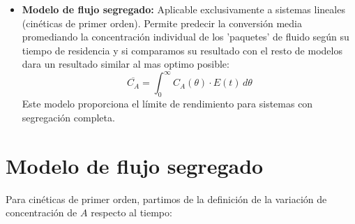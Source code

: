 \begin{itemize}
    \item \textbf{Modelo de flujo segregado:} \label{sec:flujo_segregado}
          Aplicable exclusivamente a sistemas lineales (cinéticas de primer orden). Permite predecir la conversión media promediando la concentración individual de los 'paquetes' de fluido según su tiempo de residencia y si comparamos su resultado con el resto de modelos dara un resultado similar al mas optimo posible:
          \begin{equation}
              \overline{C_A} = \int_{0}^{\infty} C_A(\theta) \cdot E(t) \, d\theta \label{eq:flujo_segregado_1}
          \end{equation}
          Este modelo proporciona el límite de rendimiento para sistemas con segregación completa.
\end{itemize}
\section{Modelo de flujo segregado}
\noindent Para cinéticas de primer orden, partimos de la definición de la variación de concentración de $A$ respecto al tiempo:

